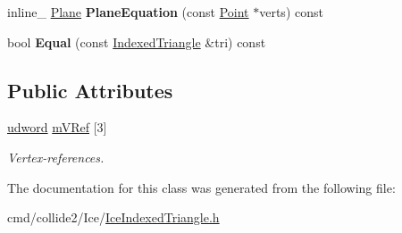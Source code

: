 \begin{DoxyCompactItemize}
\item 
inline\+\_\+ \hyperlink{classPlane}{Plane} {\bfseries Plane\+Equation} (const \hyperlink{classPoint}{Point} $\ast$verts) const \hypertarget{classIndexedTriangle_a14e2d37a22733d895df30b14d82b7ee3}{}\label{classIndexedTriangle_a14e2d37a22733d895df30b14d82b7ee3}

\item 
bool {\bfseries Equal} (const \hyperlink{classIndexedTriangle}{Indexed\+Triangle} \&tri) const \hypertarget{classIndexedTriangle_a15b576c437f90be4d6b9e015006deb75}{}\label{classIndexedTriangle_a15b576c437f90be4d6b9e015006deb75}

\end{DoxyCompactItemize}
\subsection*{Public Attributes}
\begin{DoxyCompactItemize}
\item 
\hyperlink{IceTypes_8h_a44c6f1920ba5551225fb534f9d1a1733}{udword} \hyperlink{classIndexedTriangle_a1d3a5d08862ea2cdaf4ed3e15aa19166}{m\+V\+Ref} \mbox{[}3\mbox{]}\hypertarget{classIndexedTriangle_a1d3a5d08862ea2cdaf4ed3e15aa19166}{}\label{classIndexedTriangle_a1d3a5d08862ea2cdaf4ed3e15aa19166}

\begin{DoxyCompactList}\small\item\em Vertex-\/references. \end{DoxyCompactList}\end{DoxyCompactItemize}


The documentation for this class was generated from the following file\+:\begin{DoxyCompactItemize}
\item 
cmd/collide2/\+Ice/\hyperlink{IceIndexedTriangle_8h}{Ice\+Indexed\+Triangle.\+h}\end{DoxyCompactItemize}
